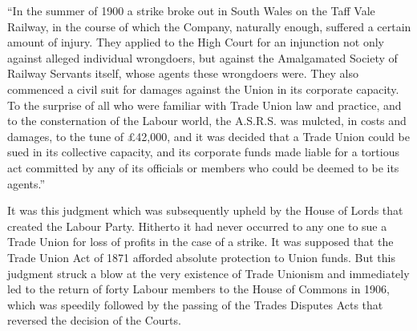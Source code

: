 \documentclass{book}
\begin{document}
“In the summer of 1900 a strike broke out in South Wales on the Taff Vale Railway, in the course of which the Company, naturally enough, suffered a certain amount of injury. They applied to the High Court for an injunction not only against alleged individual wrongdoers, but against the Amalgamated Society of Railway Servants itself, whose agents these wrongdoers were. They also commenced a civil suit for damages against the Union in its corporate capacity. To the surprise of all who were familiar with Trade Union law and practice, and to the consternation of the Labour world, the A.S.R.S. was mulcted, in costs and damages, to the tune of £42,000, and it was decided that a Trade Union could be sued in its collective capacity, and its corporate funds made liable for a tortious act committed by any of its officials or members who could be deemed to be its agents.”\footnotemark[3]

It was this judgment which was subsequently upheld by the House of Lords that created the Labour Party. Hitherto it had never occurred to any one to sue a Trade Union for loss of profits in the case of a strike. It was supposed that the Trade Union Act of 1871 afforded absolute protection to Union funds. But this judgment struck a blow at the very existence of Trade Unionism and immediately led to the return of forty Labour members to the House of Commons in 1906, which was speedily followed by the passing of the Trades Disputes Acts that reversed the decision of the Courts.
\end{document}
